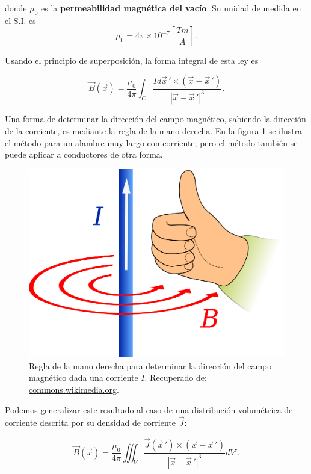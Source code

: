 donde $\mu_0$ es la \textbf{permeabilidad magnética del vacío}. Su unidad de medida en el S.I. es \cite{Griffiths}
$$\mu_0 = 4\pi \times 10^{-7} \left[ \frac{Tm}{A} \right].$$

Usando el principio de superposición, la forma integral de esta ley es
\begin{shaded}
    $$\vec{B}(\vec{x}) = \frac{\mu_0}{4\pi} \int_C \frac{I d\vec{x}\,' \times (\vec{x} - \vec{x}\,') }{|\vec{x} - \vec{x}\,'|^3}.$$
\end{shaded}

Una forma de determinar la dirección del campo magnético, sabiendo la dirección de la corriente, es mediante la regla de la mano derecha. En la  figura \ref{fig:Mano-Derecha-B} se ilustra el método para un alambre muy largo con corriente, pero el método también se puede aplicar a conductores de otra forma.

\begin{figure}[H]
    \centering
    \includegraphics[scale = 0.18]{Figuras/Manoderecha.png}
    \caption{Regla de la mano derecha para determinar la dirección del campo magnético dada una corriente $I$. Recuperado de: \href{https://commons.wikimedia.org/wiki/File:Manoderecha.svg}{commons.wikimedia.org}.}
    \label{fig:Mano-Derecha-B}
\end{figure}

Podemos generalizar este resultado al caso de una distribución volumétrica de corriente descrita por su densidad de corriente $\Vec{J}$:
\begin{shaded}
    $$\Vec{B}(\vec{x}) = \frac{\mu_0}{4\pi} \iiint_V \frac{\Vec{J}(\vec{x}\,') \times (\Vec{x} - \Vec{x}\,')}{|\Vec{x} - \Vec{x}\,'|^3} dV'.$$
\end{shaded}

